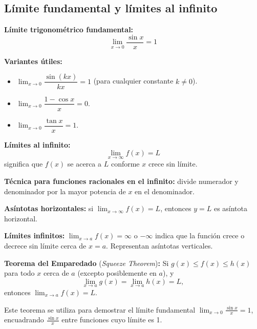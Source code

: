 \documentclass[12pt, a4paper]{article}
\begin{document}
\subsection{Límite fundamental y límites al infinito}

\begin{cuadroteoria}
  \textbf{Límite trigonométrico fundamental:}
  $$\boxed{\lim_{x \to 0} \frac{\sin x}{x} = 1}$$

  \textbf{Variantes útiles:}
  \begin{itemize}[leftmargin=*]
    \item $\lim_{x \to 0} \dfrac{\sin(kx)}{kx} = 1$ (para cualquier constante $k \neq 0$).
    \item $\lim_{x \to 0} \dfrac{1 - \cos x}{x} = 0$.
    \item $\lim_{x \to 0} \dfrac{\tan x}{x} = 1$.
  \end{itemize}
\end{cuadroteoria}

\begin{cuadrosolucion}
  \textbf{Límites al infinito:}
  $$\lim_{x \to \infty} f(x) = L$$
  significa que $f(x)$ se acerca a $L$ conforme $x$ crece sin límite.

  \textbf{Técnica para funciones racionales en el infinito:} divide numerador y denominador por la mayor potencia de $x$ en el denominador.

  \textbf{Asíntotas horizontales:} si $\lim_{x \to \infty} f(x) = L$, entonces $y = L$ es asíntota horizontal.
\end{cuadrosolucion}

\begin{cuadroadvertencia}
  \textbf{Límites infinitos:} $\lim_{x \to a} f(x) = \infty$ o $-\infty$ indica que la función crece o decrece sin límite cerca de $x = a$. Representan asíntotas verticales.
\end{cuadroadvertencia}

\begin{cuadroextra}
  \textbf{Teorema del Emparedado} (\textit{Squeeze Theorem})\textbf{:} Si $g(x) \leq f(x) \leq h(x)$ para todo $x$ cerca de $a$ (excepto posiblemente en $a$), y
  $$\lim_{x \to a} g(x) = \lim_{x \to a} h(x) = L,$$
  entonces $\lim_{x \to a} f(x) = L$.

  Este teorema se utiliza para demostrar el límite fundamental $\lim_{x \to 0} \frac{\sin x}{x} = 1$, encuadrando $\frac{\sin x}{x}$ entre funciones cuyo límite es 1.
\end{cuadroextra}
\end{document}
